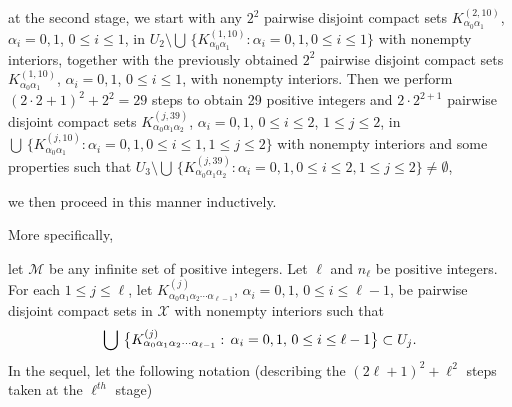 \documentclass[12pt]{article}
\newcommand{\al}{\alpha}
\begin{document}
at the second stage, we start with any $2^2$ pairwise disjoint compact sets $K_{\al_0\al_1}^{(2,10)}$, $\al_i = 0, 1$, $0 \le i \le 1$, in $U_2 \setminus \bigcup \, \{ K_{\al_0\al_1}^{(1,10)}: \al_i = 0, 1, 0 \le i \le 1 \}$ with nonempty interiors, together with the previously obtained $2^2$ pairwise disjoint compact sets $K_{\al_0\al_1}^{(1,10)}$, $\al_i = 0, 1$, $0 \le i \le 1$, with nonempty interiors.  Then we perform $(2 \cdot 2 +1)^2 + 2^2 = 29$ steps to obtain 29 positive integers and $2 \cdot 2^{2+1}$ pairwise disjoint compact sets $K_{\al_0\al_1\al_2}^{(j,39)}$, $\al_i = 0, 1$, $0 \le i \le 2$, $1 \le j \le 2$, in $\bigcup \, \{ K_{\al_0\al_1}^{(j,10)}: \al_i = 0,1, 0 \le i \le 1, 1 \le j \le 2 \}$ with nonempty interiors and some properties such that $U_3 \setminus \bigcup \, \{ K_{\al_0\al_1\al_2}^{(j,39)}: \al_i = 0, 1, 0 \le i \le 2, 1 \le j \le 2 \} \ne \emptyset$,

we then proceed in this manner inductively.  

More specifically, 

let $\mathcal M$ be any infinite set of positive integers.  Let $\ell$ and $n_\ell$ be positive integers.  For each $1 \le j \le \ell$, let $K_{\al_0\al_1\al_2\cdots \al_{\ell-1}}^{(j)}$, $\al_i = 0, 1, \, 0 \le i \le \ell-1$, be pairwise disjoint compact sets in $\mathcal X$ with nonempty interiors such that 
$$
\bigcup \, \big\{ K_{\al_0\al_1\al_2\cdots \al_{\ell-1}}^{(j)}: \, \al_i = 0, 1, \, 0 \le i \le \ell-1 \big\} \subset U_j.\vspace{.1in}
$$
\indent In the sequel, let the following notation (describing the $(2\ell+1)^2+\ell^2$ steps taken at the $\ell^{th}$ stage)
\end{document}
